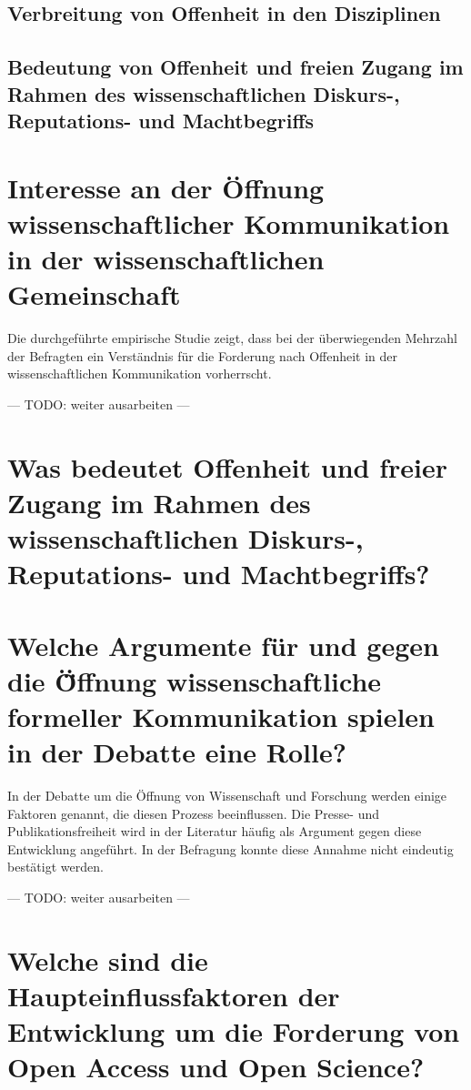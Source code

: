 \subsection{Verbreitung von Offenheit in den Disziplinen}

\subsection{Bedeutung von Offenheit und freien Zugang im Rahmen des wissenschaftlichen Diskurs-, Reputations- und Machtbegriffs}

\section{Interesse an der Öffnung wissenschaftlicher Kommunikation in der wissenschaftlichen Gemeinschaft}

Die durchgeführte empirische Studie zeigt, dass bei der überwiegenden Mehrzahl der Befragten ein Verständnis für die Forderung nach Offenheit in der wissenschaftlichen Kommunikation vorherrscht.

--- TODO: weiter ausarbeiten ---

\section{Was bedeutet Offenheit und freier Zugang im Rahmen des wissenschaftlichen Diskurs-, Reputations- und Machtbegriffs?}

\section{Welche Argumente für und gegen die Ö̈ffnung wissenschaftliche formeller Kommunikation spielen in der Debatte eine Rolle?}

In der Debatte um die Öffnung von Wissenschaft und Forschung werden einige Faktoren genannt, die diesen Prozess beeinflussen. Die Presse- und Publikationsfreiheit wird in der Literatur häufig als Argument gegen diese Entwicklung angeführt. In der Befragung konnte diese Annahme nicht eindeutig bestätigt werden.

--- TODO: weiter ausarbeiten ---

\section{Welche sind die Haupteinflussfaktoren der Entwicklung um die Forderung von Open Access und Open Science?}

